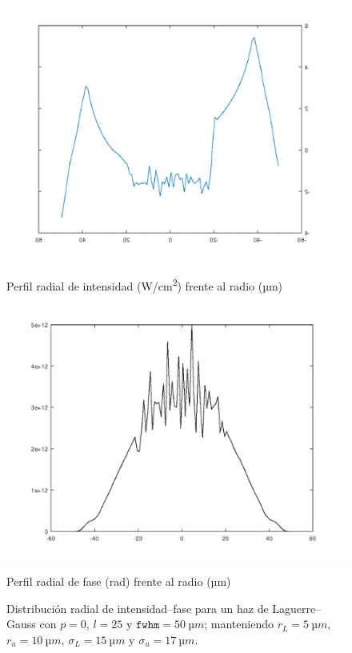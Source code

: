 \begin{figure}[htbp]
  \centering
  \begin{subcaptionblock}{.4\textwidth}
    \centering
    \includegraphics[width=\textwidth]{Figuras/anx_oamfs_6.png}
    \caption*{Perfil radial de intensidad (\unit{W/cm^2}) frente al radio (\unit{µm})}
  \end{subcaptionblock}
  \begin{subcaptionblock}{.4\textwidth}
    \centering
    \includegraphics[width=\textwidth]{Figuras/anx_oamint_6.png}
    \caption*{Perfil radial de fase (\unit{rad}) frente al radio (\unit{µm})}
  \end{subcaptionblock}
   \caption*{Distribución radial de intensidad--fase para un haz de Laguerre--Gauss con $p=0$, $l=25$ y $\texttt{fwhm}=\qty{50}{µm}$; manteniendo $r_{L}=\qty{5}{µm}$, $r_{u}=\qty{10}{µm}$, $\sigma_{L}=\qty{15}{µm}$ y $\sigma_{u}=\qty{17}{µm}$.}
\end{figure}


